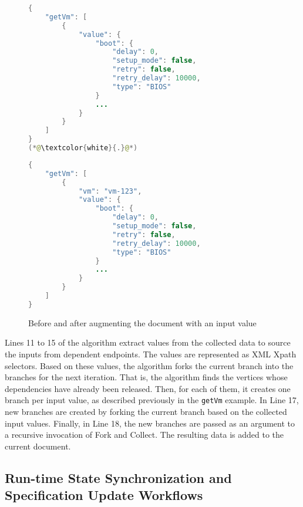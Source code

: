 \begin{figure}[p]
	\centering
	\begin{minipage}{.48\textwidth}
		\begin{lstlisting}[style=json,language=java]
{
	"getVm": [
		{
			"value": {
				"boot": {
					"delay": 0,
					"setup_mode": false,
					"retry": false,
					"retry_delay": 10000,
					"type": "BIOS"
				}
				...
			}
		}
	]
}
(*@\textcolor{white}{.}@*)
		\end{lstlisting}
	\end{minipage}
	\hfill
	\begin{minipage}{.48\textwidth}
		\begin{lstlisting}[style=json,language=java]
{
	"getVm": [
		{
			"vm": "vm-123",
			"value": {
				"boot": {
					"delay": 0,
					"setup_mode": false,
					"retry": false,
					"retry_delay": 10000,
					"type": "BIOS"
				}
				...
			}
		}
	]
}
		\end{lstlisting}
	\end{minipage}
	\caption{Before and after augmenting the document with an input value}
	\label{fig:delivery-platform--json-transformation-augment}
\end{figure}

Lines 11 to 15 of the algorithm extract values from the collected data to source the inputs from dependent endpoints. The values are represented as XML Xpath selectors. Based on these values, the algorithm forks the current branch into the branches for the next iteration. That is, the algorithm finds the vertices whose dependencies have already been released. Then, for each of them, it creates one branch per input value, as described previously in the \texttt{getVm} example. In Line 17, new branches are created by forking the current branch based on the collected input values. Finally, in Line 18, the new branches are passed as an argument to a recursive invocation of Fork and Collect. The resulting data is added to the current document.

\subsection{Run-time State Synchronization and Specification Update Workflows}
\label{subsect:delivery-platform--run-time-state-synchronization}

